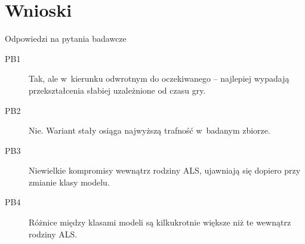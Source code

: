 \documentclass[aspectratio=169,11pt]{beamer}
\begin{document}
\section{Wnioski}

\begin{frame}{Odpowiedzi na pytania badawcze}

  \begin{description}
    \item[PB1] Tak, ale w~kierunku odwrotnym do oczekiwanego -- najlepiej wypadają
               przekształcenia słabiej uzależnione od czasu gry.
    \vspace{0.5em}
    \item[PB2] Nie. Wariant stały osiąga najwyższą trafność w~badanym zbiorze.
    \vspace{0.5em}
    \item[PB3] Niewielkie kompromisy wewnątrz rodziny ALS, ujawniają się dopiero przy zmianie klasy modelu.
    \vspace{0.5em}
    \item[PB4] Różnice między klasami modeli są kilkukrotnie większe niż te wewnątrz rodziny ALS.
  \end{description}

\end{frame}

\end{document}
